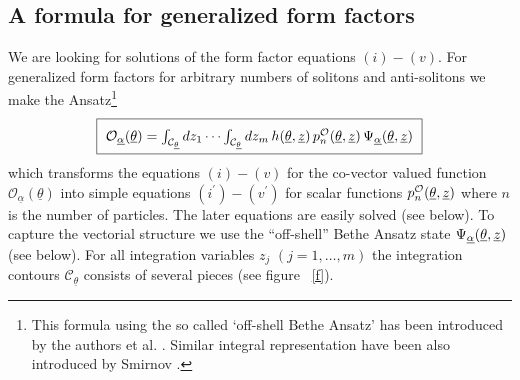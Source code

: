 \documentclass[a4paper,12pt]{article}
\begin{document}
\subsection*{A formula for generalized form factors}

We are looking for solutions of the form factor equations $(i)-(v)$. For
generalized form factors for arbitrary numbers of solitons and anti-solitons
we make the Ansatz\footnote{%
This formula using the so called `off-shell Bethe Ansatz' has been
introduced by the authors et al. \cite{BFKZ}. Similar integral representation
have been also introduced by Smirnov \cite{Sm}.} 
\begin{equation}
\fbox{$\rule{0in}{0.17in}~\mathcal{O}_{\underline{\alpha }}(\underline{%
\theta })=\int_{\mathcal{C}_{\underline{\theta }}}dz_{1}\cdots \int_{%
\mathcal{C}_{\underline{\theta }}}dz_{m}\,h(\underline{\theta },{\underline{z%
}})\,p_{n}^{\mathcal{O}}(\underline{\theta },{\underline{z}})\,\Psi _{%
\underline{\alpha }}(\underline{\theta },{\underline{z}})~$}  \label{1}
\end{equation}
which transforms the equations $(i)-(v)$ for the co-vector valued function $%
\mathcal{O}_{\underline{\alpha }}(\underline{\theta })$ into simple
equations $(i^{\prime })-(v^{\prime })$ for scalar functions $p_{n}^{%
\mathcal{O}}(\underline{\theta },{\underline{z})}$ where $n$ is the number
of particles. The later equations are easily solved (see below). To capture
the vectorial structure we use the ``off-shell'' Bethe Ansatz state $\Psi _{%
\underline{\alpha }}(\underline{\theta },{\underline{z}})$ (see below). For
all integration variables $z_{j}$ $(j=1,\dots ,m)$ the integration contours $%
\mathcal{C}_{\underline{\theta }}$ consists of several pieces (see figure~%
\ref{f}). 
\end{document}
